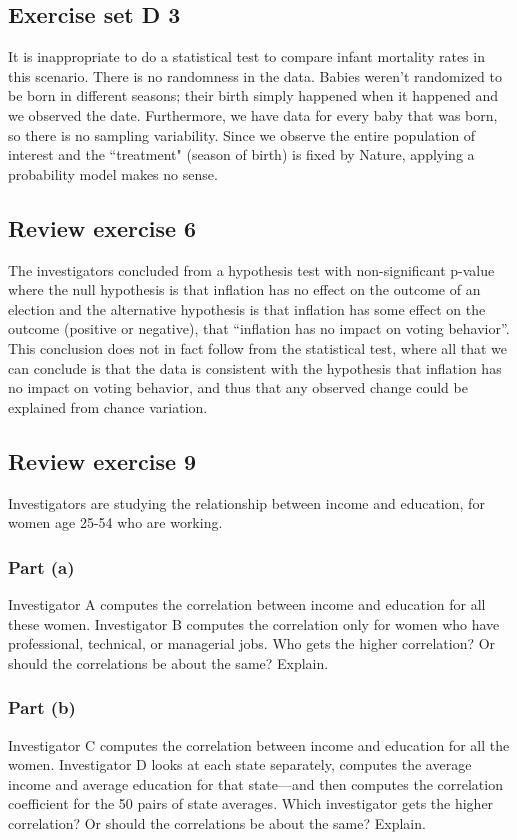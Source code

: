 \documentclass[11pt]{article}
\begin{document}
\subsection*{Exercise set D 3} %
It is inappropriate to do a statistical test to compare infant mortality rates in this scenario.  There is no randomness in the data.  Babies weren't randomized to be born in different seasons; their birth simply happened when it happened and we observed the date.  Furthermore, we have data for every baby that was born, so there is no sampling variability.  Since we observe the entire population of interest and the ``treatment" (season of birth) is fixed by Nature, applying a probability model makes no sense.




\subsection*{Review exercise 6} %


The investigators concluded from a hypothesis test with non-significant p-value where the null hypothesis is that inflation has no effect on the outcome of an election and the alternative hypothesis is that inflation has some effect on the outcome (positive or negative), that ``inflation has no impact on voting behavior''. This conclusion does not in fact follow from the statistical test, where all that we can conclude is that the data is consistent with the hypothesis that inflation has no impact on voting behavior, and thus that any observed change could be explained from chance variation.



\subsection*{Review exercise 9} %
Investigators are studying the relationship between income and education, for women age 25-54 who are working.
\subsubsection*{Part (a)}
Investigator A computes the correlation between income and education for all these women.
Investigator B computes the correlation only for women who have professional, technical, or managerial jobs.
Who gets the higher correlation?
Or should the correlations be about the same?
Explain.

\subsubsection*{Part (b)}
Investigator C computes the correlation between income and education for all the women.
Investigator D looks at each state separately, computes the average income and average education for that state---and then computes the correlation coefficient for the 50 pairs of state averages.
Which investigator gets the higher correlation?
Or should the correlations be about the same?
Explain.
\end{document}
